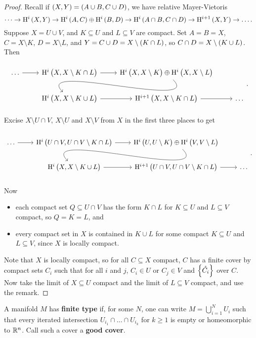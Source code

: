 \begin{proof}
Recall if $ \br{X, Y} = \br{A \cup B, C \cup D} $, we have relative Mayer-Vietoris
$$ \dots \to \H^i\br{X, Y} \to \H^i\br{A, C} \oplus \H^i\br{B, D} \to \H^i\br{A \cap B, C \cap D} \to \H^{i + 1}\br{X, Y} \to \dots. $$
Suppose $ X = U \cup V $, and $ K \subseteq U $ and $ L \subseteq V $ are compact. Set $ A = B = X $, $ C = X \setminus K $, $ D = X \setminus L $, and $ Y = C \cup D = X \setminus \br{K \cap L} $, so $ C \cap D = X \setminus \br{K \cup L} $. Then
$$
\begin{tikzcd}
\dots \arrow{r} & \H^i\br{X, X \setminus K \cap L} \arrow{r} & \H^i\br{X, X \setminus K} \oplus \H^i\br{X, X \setminus L} \arrow[in=135, out=-45]{dl} & \\
& \H^i\br{X, X \setminus K \cup L} \arrow{r} & \H^{i + 1}\br{X, X \setminus K \cap L} \arrow{r} & \dots
\end{tikzcd}.
$$
Excise $ X \setminus U \cap V $, $ X \setminus U $ and $ X \setminus V $ from $ X $ in the first three places to get
$$
\begin{tikzcd}
\dots \arrow{r} & \H^i\br{U \cap V, U \cap V \setminus K \cap L} \arrow{r} & \H^i\br{U, U \setminus K} \oplus \H^i\br{V, V \setminus L} \arrow[in=135, out=-45]{dl} & \\
& \H^i\br{X, X \setminus K \cup L} \arrow{r} & \H^{i + 1}\br{U \cap V, U \cap V \setminus K \cap L} \arrow{r} & \dots
\end{tikzcd}.
$$
Now
\begin{itemize}
\item each compact set $ Q \subseteq U \cap V $ has the form $ K \cap L $ for $ K \subseteq U $ and $ L \subseteq V $ compact, so $ Q = K = L $, and
\item every compact set in $ X $ is contained in $ K \cup L $ for some compact $ K \subseteq U $ and $ L \subseteq V $, since $ X $ is locally compact.
\end{itemize}
Note that $ X $ is locally compact, so for all $ C \subseteq X $ compact, $ C $ has a finite cover by compact sets $ C_i $ such that for all $ i $ and $ j $, $ C_i \in U $ or $ C_j \in V $ and $ \cbr{\mathring{C_i}} $ over $ C $. Now take the limit of $ X \subseteq U $ compact and the limit of $ L \subseteq V $ compact, and use the remark.
\end{proof}

\begin{definition*}
A manifold $ M $ has \textbf{finite type} if, for some $ N $, one can write $ M = \bigcup_{i = 1}^N U_i $ such that every iterated intersection $ U_{i_1} \cap \dots \cap U_{i_k} $ for $ k \ge 1 $ is empty or homeomorphic to $ \mathbb{R}^n $. Call such a cover a \textbf{good cover}.
\end{definition*}

